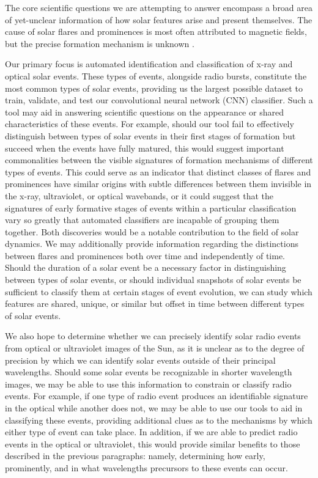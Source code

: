 \documentclass[12pt, letterpaper]{article}
\begin{document}
The core scientific questions we are attempting to answer encompass a broad area of yet-unclear information of how solar features arise and present themselves. The cause of solar flares and prominences is most often attributed to magnetic fields, but the precise formation mechanism is unknown \cite{BOB}. 

Our primary focus is automated identification and classification of x-ray and optical solar events. These types of events, alongside radio bursts, constitute the most common types of solar events, providing us the largest possible dataset to train, validate, and test our convolutional neural network (CNN) classifier. Such a tool may aid in answering scientific questions on the appearance or shared characteristics of these events. For example, should our tool fail to effectively distinguish between types of solar events in their first stages of formation but succeed when the events have fully matured, this would suggest important commonalities between the visible signatures of formation mechanisms of different types of events. This could serve as an indicator that distinct classes of flares and prominences have similar origins with subtle differences between them invisible in the x-ray, ultraviolet, or optical wavebands, or it could suggest that the signatures of early formative stages of events within a particular classification vary so greatly that automated classifiers are incapable of grouping them together. Both discoveries would be a notable contribution to the field of solar dynamics. We may additionally provide information regarding the distinctions between flares and prominences both over time and independently of time. Should the duration of a solar event be a necessary factor in distinguishing between types of solar events, or should individual snapshots of solar events be sufficient to classify them at certain stages of event evolution, we can study which features are shared, unique, or similar but offset in time between different types of solar events. 

We also hope to determine whether we can precisely identify solar radio events from optical or ultraviolet images of the Sun, as it is unclear as to the degree of precision by which we can identify solar events outside of their principal wavelengths. Should some solar events be recognizable in shorter wavelength images, we may be able to use this information to constrain or classify radio events. For example, if one type of radio event produces an identifiable signature in the optical while another does not, we may be able to use our tools to aid in classifying these events, providing additional clues as to the mechanisms by which either type of event can take place. In addition, if we are able to predict radio events in the optical or ultraviolet, this would provide similar benefits to those described in the previous paragraphs: namely, determining how early, prominently, and in what wavelengths precursors to these events can occur.
\end{document}
